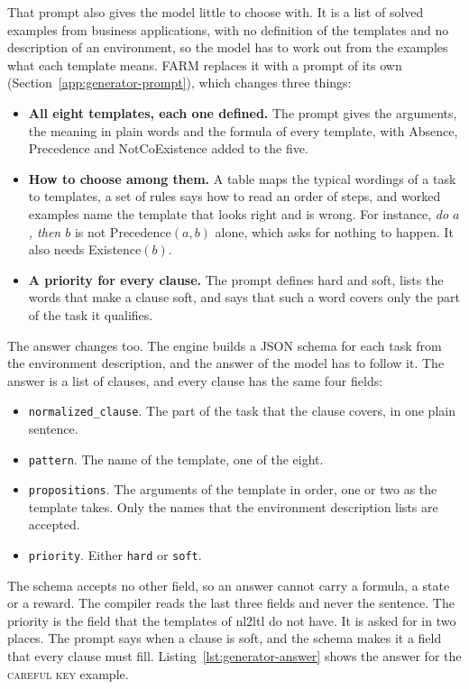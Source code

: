 \documentclass[11pt,english,listoffigures,listoftables]{tfgetsinf}
\newcommand{\runex}[1]{\textsc{#1}}  %
\begin{document}
That prompt also gives the model little to choose with. It is a list of solved examples from business applications, with no definition of the templates and no description of an environment, so the model has to work out from the examples what each template means. FARM replaces it with a prompt of its own (Section~\ref{app:generator-prompt}), which changes three things:
\begin{itemize}
    \item \textbf{All eight templates, each one defined.} The prompt gives the arguments, the meaning in plain words and the formula of every template, with Absence, Precedence and NotCoExistence added to the five.
    \item \textbf{How to choose among them.} A table maps the typical wordings of a task to templates, a set of rules says how to read an order of steps, and worked examples name the template that looks right and is wrong. For instance, \textit{do $a$, then $b$} is not Precedence$(a,b)$ alone, which asks for nothing to happen. It also needs Existence$(b)$.
    \item \textbf{A priority for every clause.} The prompt defines hard and soft, lists the words that make a clause soft, and says that such a word covers only the part of the task it qualifies.
\end{itemize}

The answer changes too. The engine builds a JSON schema for each task from the environment description, and the answer of the model has to follow it. The answer is a list of clauses, and every clause has the same four fields:
\begin{itemize}
    \item \texttt{normalized\_clause}. The part of the task that the clause covers, in one plain sentence.
    \item \texttt{pattern}. The name of the template, one of the eight.
    \item \texttt{propositions}. The arguments of the template in order, one or two as the template takes. Only the names that the environment description lists are accepted.
    \item \texttt{priority}. Either \texttt{hard} or \texttt{soft}.
\end{itemize}
The schema accepts no other field, so an answer cannot carry a formula, a state or a reward. The compiler reads the last three fields and never the sentence. The priority is the field that the templates of nl2ltl do not have. It is asked for in two places. The prompt says when a clause is soft, and the schema makes it a field that every clause must fill. Listing~\ref{lst:generator-answer} shows the answer for the \runex{careful key} example.
\end{document}
